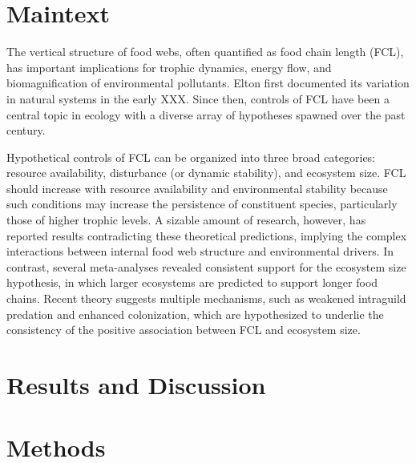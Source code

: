 \documentclass[11pt, class=article, crop=false]{standalone}
\begin{document}
\section{Maintext}

The vertical structure of food webs, often quantified as food chain length (FCL), has important implications for trophic dynamics, energy flow, and biomagnification of environmental pollutants.
Elton first documented its variation in natural systems in the early XXX.
Since then, controls of FCL have been a central topic in ecology with a diverse array of hypotheses spawned over the past century.

Hypothetical controls of FCL can be organized into three broad categories: resource availability, disturbance (or dynamic stability), and ecosystem size.
FCL should increase with resource availability and environmental stability because such conditions may increase the persistence of constituent species, particularly those of higher trophic levels.
A sizable amount of research, however, has reported results contradicting these theoretical predictions, implying the complex interactions between internal food web structure and environmental drivers.
In contrast, several meta-analyses revealed consistent support for the ecosystem size hypothesis, in which larger ecosystems are predicted to support longer food chains.
Recent theory suggests multiple mechanisms, such as weakened intraguild predation and enhanced colonization, which are hypothesized to underlie the consistency of the positive association between FCL and ecosystem size.


\section{Results and Discussion}
\section{Methods}
\end{document}

